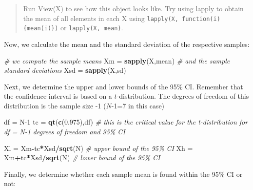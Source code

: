 \documentclass[
]{book}
\newenvironment{Shaded}{\begin{snugshade}}{\end{snugshade}}
\newcommand{\CommentTok}[1]{\textcolor[rgb]{0.56,0.35,0.01}{\textit{#1}}}
\newcommand{\DecValTok}[1]{\textcolor[rgb]{0.00,0.00,0.81}{#1}}
\newcommand{\FloatTok}[1]{\textcolor[rgb]{0.00,0.00,0.81}{#1}}
\newcommand{\FunctionTok}[1]{\textcolor[rgb]{0.13,0.29,0.53}{\textbf{#1}}}
\newcommand{\NormalTok}[1]{#1}
\newcommand{\OtherTok}[1]{\textcolor[rgb]{0.56,0.35,0.01}{#1}}
\newcommand{\SpecialCharTok}[1]{\textcolor[rgb]{0.81,0.36,0.00}{\textbf{#1}}}
\begin{document}
\begin{quote}
Run View(X) to see how this object looks like. Try using lapply to obtain the mean of all elements in each X using \texttt{lapply(X,\ function(i)\{mean(i)\})} or \texttt{lapply(X,\ mean)}.
\end{quote}

Now, we calculate the mean and the standard deviation of the respective samples:

\begin{Shaded}
\begin{Highlighting}[]
\CommentTok{\# we compute the sample means}
\NormalTok{Xm }\OtherTok{=} \FunctionTok{sapply}\NormalTok{(X,mean)}
\CommentTok{\# and the sample standard deviations}
\NormalTok{Xsd }\OtherTok{=} \FunctionTok{sapply}\NormalTok{(X,sd) }
\end{Highlighting}
\end{Shaded}

Next, we determine the upper and lower bounds of the 95\% CI. Remember that the confidence interval is based on a \(t\)-distribution. The degrees of freedom of this distribution is the sample size -1 (\(N\)-1=7 in this case)

\begin{Shaded}
\begin{Highlighting}[]
\NormalTok{df }\OtherTok{=}\NormalTok{ N}\DecValTok{{-}1}
\NormalTok{tc }\OtherTok{=} \FunctionTok{qt}\NormalTok{(}\FunctionTok{c}\NormalTok{(}\FloatTok{0.975}\NormalTok{),df) }\CommentTok{\# this is the critical value for the t{-}distribution for df = N{-}1 degrees of freedom and 95\% CI}

\NormalTok{Xl }\OtherTok{=}\NormalTok{ Xm}\SpecialCharTok{{-}}\NormalTok{tc}\SpecialCharTok{*}\NormalTok{Xsd}\SpecialCharTok{/}\FunctionTok{sqrt}\NormalTok{(N) }\CommentTok{\# upper bound of the 95\% CI}
\NormalTok{Xh }\OtherTok{=}\NormalTok{ Xm}\SpecialCharTok{+}\NormalTok{tc}\SpecialCharTok{*}\NormalTok{Xsd}\SpecialCharTok{/}\FunctionTok{sqrt}\NormalTok{(N) }\CommentTok{\# lower bound of the 95\% CI}
\end{Highlighting}
\end{Shaded}

Finally, we determine whether each sample mean is found within the 95\% CI or not:
\end{document}
